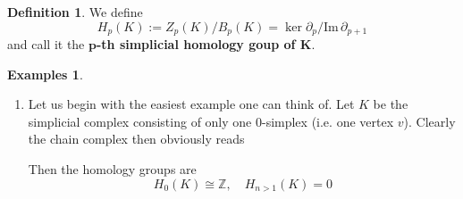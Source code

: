 \documentclass[toc=bib]{scrartcl}
\theoremstyle{plain}
\theoremstyle{definition}
\newtheorem	{definition}[theorem]{Definition}
\newtheorem{examples}[theorem]{Examples}
\theoremstyle{remark}
\newcommand{\isom}{\cong}
\newcommand{\Z}{\mathbb{Z}}
\newcommand{\im}{\mathrm{Im}\,}
\begin{document}
\begin{definition}
	We define \[
	H_p(K):=Z_p(K)/B_p(K)=\ker \partial_p/\im \partial_{p+1}
	\]
	and call it the \textbf{$\mathbf{p}$-th simplicial homology goup of $\mathbf{K}$}.
\end{definition}
\begin{examples}\mbox{}
	\begin{enumerate}

\item Let us begin with the easiest example one can think of. Let $K$ be the simplicial complex consisting of only one 0-simplex (i.e. one vertex $v$). Clearly the chain complex then obviously reads

\begin{center}
\end{center}
Then the homology groups are \[
H_0(K)\isom\Z,\quad H_{n>1}(K)=0
\]



\end{enumerate}
\end{examples}
\end{document}
